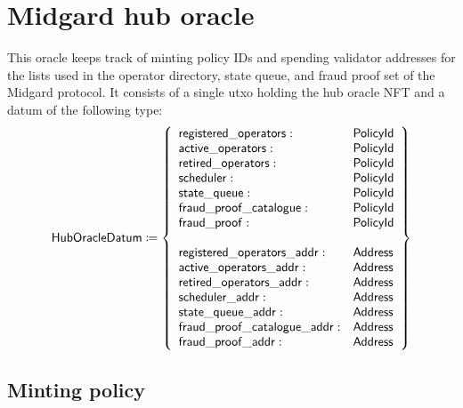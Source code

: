 \documentclass[../midgard.tex]{subfiles}
\begin{document}
\section{Midgard hub oracle}
\label{h:midgard-hub-oracle}

This oracle keeps track of minting policy IDs and spending validator addresses for the lists used in the operator directory, state queue, and fraud proof set of the Midgard protocol. It consists of a single utxo holding the hub oracle NFT and a datum of the following type:
\begin{equation*}
    \mathsf{HubOracleDatum} \coloneq \left\{
    \begin{array}{ll}
        \mathsf{registered\_operators} : & \mathsf{PolicyId} \\
        \mathsf{active\_operators} : & \mathsf{PolicyId} \\
        \mathsf{retired\_operators} : & \mathsf{PolicyId} \\
        \mathsf{scheduler} : & \mathsf{PolicyId} \\
        \mathsf{state\_queue} : & \mathsf{PolicyId} \\
        \mathsf{fraud\_proof\_catalogue} : & \mathsf{PolicyId} \\
        \mathsf{fraud\_proof} : & \mathsf{PolicyId} \\
        \\
        \mathsf{registered\_operators\_addr} : & \mathsf{Address} \\
        \mathsf{active\_operators\_addr} : & \mathsf{Address} \\
        \mathsf{retired\_operators\_addr} : & \mathsf{Address} \\
        \mathsf{scheduler\_addr} : & \mathsf{Address} \\
        \mathsf{state\_queue\_addr} : & \mathsf{Address} \\
        \mathsf{fraud\_proof\_catalogue\_addr} : & \mathsf{Address} \\
        \mathsf{fraud\_proof\_addr} : & \mathsf{Address}
    \end{array} \right\}
\end{equation*}

\todo

\subsection{Minting policy}
\label{h:hub-oracle-minting-policy}
\end{document}

